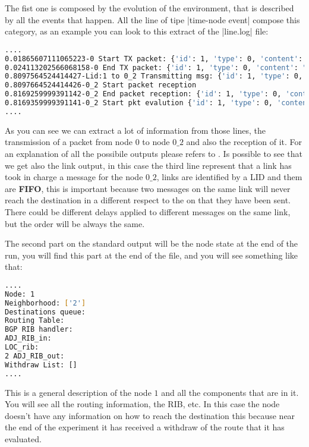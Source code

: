 \documentclass[10pt,journal,onecolumn]{IEEEtran}
\begin{document}
The fist one is composed by the evolution of the environment, that is described
by all the events that happen.
All the line of tipe |time-node event| compose this category, as an example 
you can look to this extract of the |line.log| file:

\begin{lstlisting}[language=bash]
....
0.01865607111065223-0 Start TX packet: {'id': 1, 'type': 0, 'content': "{'addr': '10.0.0.0/24', 'nh': '0', 'path': ['0'], 'policy_value': '0'}"}
0.024113202566068158-0 End TX packet: {'id': 1, 'type': 0, 'content': "{'addr': '10.0.0.0/24', 'nh': '0', 'path': ['0'], 'policy_value': '0'}"}
0.8097564524414427-Lid:1 to 0_2 Transmitting msg: {'id': 1, 'type': 0, 'content': "{'addr': '10.0.0.0/24', 'nh': '0', 'path': ['0'], 'policy_value': '0'}"}
0.8097664524414426-0_2 Start packet reception
0.8169259999391142-0_2 End packet reception: {'id': 1, 'type': 0, 'content': "{'addr': '10.0.0.0/24', 'nh': '0', 'path': ['0'], 'policy_value': '0'}"}
0.8169359999391141-0_2 Start pkt evalution {'id': 1, 'type': 0, 'content': "{'addr': '10.0.0.0/24', 'nh': '0', 'path': ['0'], 'policy_value': '0'}"}
....
\end{lstlisting}

As you can see we can extract a lot of information from those lines, the transmission
of a packet from node $0$ to node $0\_2$ and also the reception of it.
For an explanation of all the possibile outputs please refers to .
Is possible to see that we get also the link output, in this case the third line
represent that a link has took in charge a message for the node $0\_2$, links
are identified by a \ac{LID} and them are \textbf{FIFO}, this is important
because two messages on the same link will never reach the destination in 
a different respect to the on that they have been sent.
There could be different delays applied to different messages on the same
link, but the order will be always the same.

The second part on the standard output will be the node state at the end of 
the run, you will find this part at the end of the file, and you will see something
like that:

\begin{lstlisting}[language=bash]
....
Node: 1
Neighborhood: ['2']
Destinations queue: 
Routing Table:
BGP RIB handler: 
ADJ_RIB_in:
LOC_rib:
2 ADJ_RIB_out:
Withdraw List: []
....
\end{lstlisting}

This is a general description of the node $1$ and all the components that 
are in it.
You will see all the routing information, the \ac{RIB}, etc.
In this case the node doesn't have any information on how to reach the destination
this because near the end of the experiment it has received a withdraw of the
route that it has evaluated.
\end{document}
